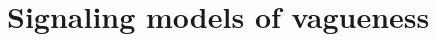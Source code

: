 \documentclass[a4paper]{article}
\begin{document}



%


\section{Signaling models of vagueness}
\label{sec:vague-signaling}


\printbibliography
\end{document}

